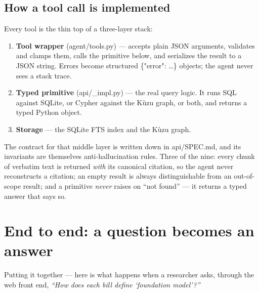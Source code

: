 \documentclass[11pt]{article}
\newcommand{\code}[1]{{\ttfamily\small #1}}
\begin{document}
\subsection{How a tool call is implemented}

Every tool is the thin top of a three-layer stack:

\begin{enumerate}[leftmargin=1.5em,itemsep=2pt]
\item \textbf{Tool wrapper} (\code{agent/tools.py}) --- accepts plain JSON
  arguments, validates and clamps them, calls the primitive below, and
  serializes the result to a JSON string. Errors become structured
  \code{\{"error": \ldots\}} objects; the agent never sees a stack trace.
\item \textbf{Typed primitive} (\code{api/\_impl.py}) --- the real query logic.
  It runs SQL against SQLite, or Cypher against the K\`uzu graph, or both, and
  returns a typed Python object.
\item \textbf{Storage} --- the SQLite FTS index and the K\`uzu graph.
\end{enumerate}

The contract for that middle layer is written down in \code{api/SPEC.md}, and
its invariants are themselves anti-hallucination rules. Three of the nine: every
chunk of verbatim text is returned \emph{with} its canonical citation, so the
agent never reconstructs a citation; an empty result is always distinguishable
from an out-of-scope result; and a primitive \emph{never} raises on ``not found''
--- it returns a typed answer that says so.

\section{End to end: a question becomes an answer}

Putting it together --- here is what happens when a researcher asks, through the
web front end, \emph{``How does each bill define `foundation model'?''}
\end{document}
